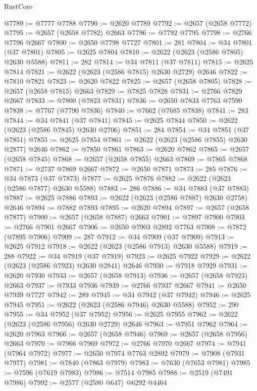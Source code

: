 \begin{lexlean}{RustCore}
\begin{coremodule}
@7789 := @7777 @7788
@7790 := @2620 @7789
@7792 := @2657 (@2658 @7772)
@7795 := @2657 (@2658 @7782) @2663
@7796 := @7792 @7795
@7798 := @2766 @7796 @2667
@7800 := @2650 @7798 @7727
@7801 := 281
@7804 := @34 @7801 (@37 @7801)
@7805 := @2625 @7804
@7810 := @2622 (@2623 (@2586 @7805) @2630 @5588)
@7811 := 282
@7814 := @34 @7811 (@37 @7811)
@7815 := @2625 @7814
@7821 := @2622 (@2623 (@2586 @7815) @2630 @2729) @2646
@7822 := @7810 @7821
@7823 := @2620 @7822
@7825 := @2657 (@2658 @7805)
@7828 := @2657 (@2658 @7815) @2663
@7829 := @7825 @7828
@7831 := @2766 @7829 @2667
@7833 := @7800 (@7823 @7831)
@7836 := @2650 @7833 @7763 @7590
@7838 := @7767 (@7790 @7836)
@7840 := @7662 (@7685 @7838)
@7841 := 283
@7844 := @34 @7841 (@37 @7841)
@7845 := @2625 @7844
@7850 := @2622 (@2623 (@2586 @7845) @2630 @2706)
@7851 := 284
@7854 := @34 @7851 (@37 @7851)
@7855 := @2625 @7854
@7861 := @2622 (@2623 (@2586 @7855) @2630 @2877) @2646
@7862 := @7850 @7861
@7863 := @2620 @7862
@7865 := @2657 (@2658 @7845)
@7868 := @2657 (@2658 @7855) @2663
@7869 := @7865 @7868
@7871 := @2737 @7869 @2667
@7872 := @2650 @7871
@7873 := 285
@7876 := @34 @7873 (@37 @7873)
@7877 := @2625 @7876
@7882 := @2622 (@2623 (@2586 @7877) @2630 @5588)
@7883 := 286
@7886 := @34 @7883 (@37 @7883)
@7887 := @2625 @7886
@7893 := @2622 (@2623 (@2586 @7887) @2630 @2758) @2646
@7894 := @7882 @7893
@7895 := @2620 @7894
@7897 := @2657 (@2658 @7877)
@7900 := @2657 (@2658 @7887) @2663
@7901 := @7897 @7900
@7903 := @2766 @7901 @2667
@7906 := @2650 @7903 @2892 @7763
@7908 := @7872 (@7895 @7906)
@7909 := 287
@7912 := @34 @7909 (@37 @7909)
@7913 := @2625 @7912
@7918 := @2622 (@2623 (@2586 @7913) @2630 @5588)
@7919 := 288
@7922 := @34 @7919 (@37 @7919)
@7923 := @2625 @7922
@7929 := @2622 (@2623 (@2586 @7923) @2630 @2841) @2646
@7930 := @7918 @7929
@7931 := @2620 @7930
@7933 := @2657 (@2658 @7913)
@7936 := @2657 (@2658 @7923) @2663
@7937 := @7933 @7936
@7939 := @2766 @7937 @2667
@7941 := @2650 @7939 @7727
@7942 := 289
@7945 := @34 @7942 (@37 @7942)
@7946 := @2625 @7945
@7951 := @2622 (@2623 (@2586 @7946) @2630 @5588)
@7952 := 290
@7955 := @34 @7952 (@37 @7952)
@7956 := @2625 @7955
@7962 := @2622 (@2623 (@2586 @7956) @2630 @2729) @2646
@7963 := @7951 @7962
@7964 := @2620 @7963
@7966 := @2657 (@2658 @7946)
@7969 := @2657 (@2658 @7956) @2663
@7970 := @7966 @7969
@7972 := @2766 @7970 @2667
@7974 := @7941 (@7964 @7972)
@7977 := @2650 @7974 @7763 @2892
@7979 := @7908 (@7931 @7977)
@7981 := @7840 (@7863 @7979)
@7983 := @7630 (@7653 @7981)
@7985 := @7596 (@7619 @7983)
@7986 := @7514 @7985
@7988 := @2519 (@7491 @7986)
@7992 := @2577 (@2580 @647) @6292 @4464

\end{coremodule}
\end{lexlean}
